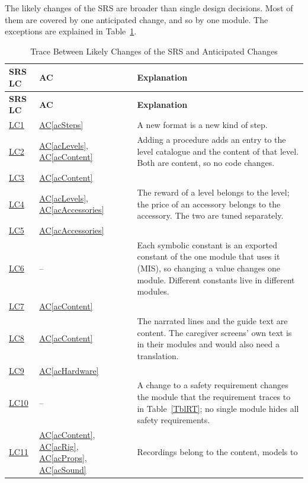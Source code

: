 \documentclass[12pt, titlepage]{article}
\newcommand{\acref}[1]{\hyperref[#1]{AC\ref*{#1}}}
\newcommand{\srsurl}{https://team-hindsight.github.io/ophthamology-game/SRS/SRS.pdf}
\newcommand{\srsitemref}[2]{\href{\srsurl\#nameddest=#1}{#2}}
\begin{document}
The likely changes of the SRS are broader than single design decisions. Most of
them are covered by one anticipated change, and so by one module. The
exceptions are explained in Table~\ref{TblLCAC}.

\begin{longtable}{p{} p{} p{}}
\caption{Trace Between Likely Changes of the SRS and Anticipated Changes}
\label{TblLCAC}\\
\toprule
\textbf{SRS LC} & \textbf{AC} & \textbf{Explanation}\\
\midrule
\endfirsthead
\toprule
\textbf{SRS LC} & \textbf{AC} & \textbf{Explanation}\\
\midrule
\endhead
\srsitemref{LC_LevelFormat}{LC1} & \acref{acSteps} & A new format is a new
kind of step.\\
\srsitemref{LC_Procedures}{LC2} & \acref{acLevels}, \acref{acContent} & Adding a
procedure adds an entry to the level catalogue and the content of that level.
Both are content, so no code changes.\\
\srsitemref{LC_ClinicalContent}{LC3} & \acref{acContent} & \\
\srsitemref{LC_Rewards}{LC4} & \acref{acLevels}, \acref{acAccessories} & The
reward of a level belongs to the level; the price of an accessory belongs to the
accessory. The two are tuned separately.\\
\srsitemref{LC_Characters}{LC5} & \acref{acAccessories} & \\
\srsitemref{LC_Constants}{LC6} & -- & Each symbolic constant is an exported
constant of the one module that uses it (MIS), so changing a value changes one
module. Different constants live in different modules.\\
\srsitemref{LC_AgeContent}{LC7} & \acref{acContent} & \\
\srsitemref{LC_Language}{LC8} & \acref{acContent} & The narrated lines and the
guide text are content. The caregiver screens' own text is in their modules and
would also need a translation.\\
\srsitemref{LC_Platforms}{LC9} & \acref{acHardware} & \\
\srsitemref{LC_Hazards}{LC10} & -- & A change to a safety requirement changes
the module that the requirement traces to in Table~\ref{TblRT}; no single
module hides all safety requirements.\\
\srsitemref{LC_Assets}{LC11} & \acref{acContent}, \acref{acRig},
\acref{acProps}, \acref{acSound} & Recordings belong to the content, models to

\end{longtable}
\end{document}
